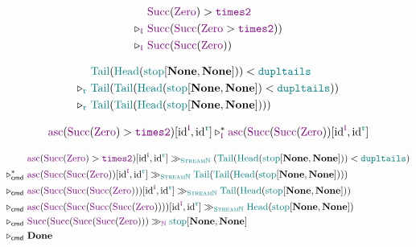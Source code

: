 \begin{minipage}{0.4\textwidth}
  \begin{align*}
    \phantom{\evaluatesto_{\polprd}}
    &
    \Succ(\Zero) > \timestwo
    \\
    \evaluatesto_{\polprd}\
    &
    \Succ(\Succ(\Zero > \timestwo))
    \\
    \evaluatesto_{\polprd}\
    &
    \Succ(\Succ(\Zero))
  \end{align*}
\end{minipage}
\begin{minipage}{0.5\textwidth}
  \begin{align*}
    \phantom{\evaluatesto_{\polcon}}
    &
    \Tail(\Head(\stopNat[\None, \None])) < \dupltails
    \\
    \evaluatesto_{\polcon}\
    &
    \Tail(\Tail(\Head(\stopNat[\None, \None]) < \dupltails))
    \\
    \evaluatesto_{\polcon}\
    &
    \Tail(\Tail(\Head(\stopNat[\None, \None])))
  \end{align*}
\end{minipage}

\begin{align*}
  \asc(\Succ(\Zero) > \timestwo)[\text{id}^{\polprd}, \text{id}^{\polcon}]
  \evaluatesto_{\polprd}^{\ast}
  \asc(\Succ(\Succ(\Zero))[\text{id}^{\polprd}, \text{id}^{\polcon}]
\end{align*}

\begin{align*}
  \phantom{\evaluatesto_{\cmd}}
  &
  \asc(\Succ(\Zero) > \timestwo)[\text{id}^{\polprd}, \text{id}^{\polcon}]
  \mkCmd_{\StreamNat}
  (\Tail(\Head(\stopNat[\None, \None])) < \dupltails)
  \\
  \evaluatesto_{\cmd}^{\ast}\
  &
  \asc(\Succ(\Succ(\Zero))[\text{id}^{\polprd}, \text{id}^{\polcon}]
  \mkCmd_{\StreamNat}
  \Tail(\Tail(\Head(\stopNat[\None, \None])))
  \\
  \evaluatesto_{\cmd}\
  &
  \asc(\Succ(\Succ(\Succ(\Zero)))[\text{id}^{\polprd}, \text{id}^{\polcon}]
  \mkCmd_{\StreamNat}
  \Tail(\Head(\stopNat[\None, \None]))
  \\
  \evaluatesto_{\cmd}\
  &
  \asc(\Succ(\Succ(\Succ(\Succ(\Zero))))[\text{id}^{\polprd}, \text{id}^{\polcon}]
  \mkCmd_{\StreamNat}
  \Head(\stopNat[\None, \None])
  \\
  \evaluatesto_{\cmd}\
  &
  \Succ(\Succ(\Succ(\Succ(\Zero)))
  \mkCmd_{\Nat}
  \stopNat[\None, \None]
  \\
  \evaluatesto_{\cmd}\
  &
  \Done
\end{align*}

